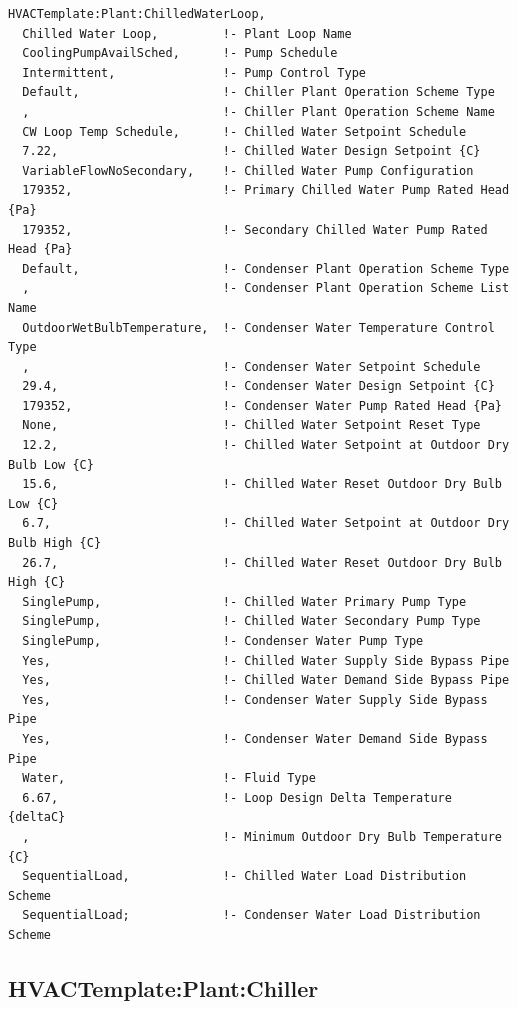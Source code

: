 \begin{lstlisting}
HVACTemplate:Plant:ChilledWaterLoop,
  Chilled Water Loop,         !- Plant Loop Name
  CoolingPumpAvailSched,      !- Pump Schedule
  Intermittent,               !- Pump Control Type
  Default,                    !- Chiller Plant Operation Scheme Type
  ,                           !- Chiller Plant Operation Scheme Name
  CW Loop Temp Schedule,      !- Chilled Water Setpoint Schedule
  7.22,                       !- Chilled Water Design Setpoint {C}
  VariableFlowNoSecondary,    !- Chilled Water Pump Configuration
  179352,                     !- Primary Chilled Water Pump Rated Head {Pa}
  179352,                     !- Secondary Chilled Water Pump Rated Head {Pa}
  Default,                    !- Condenser Plant Operation Scheme Type
  ,                           !- Condenser Plant Operation Scheme List Name
  OutdoorWetBulbTemperature,  !- Condenser Water Temperature Control Type
  ,                           !- Condenser Water Setpoint Schedule
  29.4,                       !- Condenser Water Design Setpoint {C}
  179352,                     !- Condenser Water Pump Rated Head {Pa}
  None,                       !- Chilled Water Setpoint Reset Type
  12.2,                       !- Chilled Water Setpoint at Outdoor Dry Bulb Low {C}
  15.6,                       !- Chilled Water Reset Outdoor Dry Bulb Low {C}
  6.7,                        !- Chilled Water Setpoint at Outdoor Dry Bulb High {C}
  26.7,                       !- Chilled Water Reset Outdoor Dry Bulb High {C}
  SinglePump,                 !- Chilled Water Primary Pump Type
  SinglePump,                 !- Chilled Water Secondary Pump Type
  SinglePump,                 !- Condenser Water Pump Type
  Yes,                        !- Chilled Water Supply Side Bypass Pipe
  Yes,                        !- Chilled Water Demand Side Bypass Pipe
  Yes,                        !- Condenser Water Supply Side Bypass Pipe
  Yes,                        !- Condenser Water Demand Side Bypass Pipe
  Water,                      !- Fluid Type
  6.67,                       !- Loop Design Delta Temperature {deltaC}
  ,                           !- Minimum Outdoor Dry Bulb Temperature {C}
  SequentialLoad,             !- Chilled Water Load Distribution Scheme
  SequentialLoad;             !- Condenser Water Load Distribution Scheme
\end{lstlisting}

\subsection{HVACTemplate:Plant:Chiller}\label{hvactemplateplantchiller}

